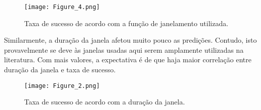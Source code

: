 \documentclass[12pt]{diazessay} %
\begin{document}
\begin{figure}
	\centering
	\texttt{[image: Figure\_4.png]}
	\caption{Taxa de sucesso de acordo com a função de janelamento utilizada. }
\end{figure}


Similarmente, a duração da janela afetou muito pouco as predições.
Contudo, isto provavelmente se deve às janelas usadas aqui serem amplamente utilizadas na literatura. 
Com mais valores, a expectativa é de que haja maior correlação entre duração da janela e taxa de sucesso.

\begin{figure}
	\centering
	\texttt{[image: Figure\_2.png]}
	\caption{Taxa de sucesso de acordo com a duração da janela.}
\end{figure}

\end{document}
